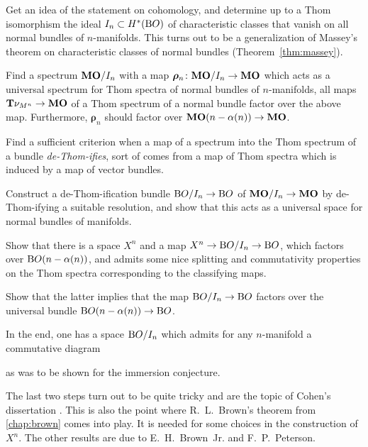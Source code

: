 \begin{steps}
\item
  Get an idea of the statement on cohomology, and determine up to a
  Thom isomorphism the ideal $I_{n}\subset H^*(\mathrm{B}O)$ of characteristic
  classes that vanish on all normal bundles of $n$-manifolds.
  This turns out to be a generalization of Massey's theorem on
  characteristic classes of normal bundles (Theorem~\ref{thm:massey}).
\item
  Find a spectrum $\bm{\mathrm{MO}}/I_{n}$ with a map
  $\bm{\rho}_n\colon \bm{\mathrm{MO}}/I_{n}\to\bm{\mathrm{MO}}$ which acts as a universal
  spectrum for Thom spectra of normal bundles of $n$-manifolds,
  \idest all maps $\bm{\mathrm{T}}{\nu_{M^n}}\to \bm{\mathrm{MO}}$ of a Thom spectrum of a
  normal bundle factor over the above map.
  Furthermore, $\bm{\rho}_n$ should factor
  over $\bm{\mathrm{MO}}(n-\alpha(n))\to\bm{\mathrm{MO}}$.
\item
  Find a sufficient criterion when a map of a spectrum into the Thom
  spectrum of a bundle \emph{de-Thom-ifies}, \idest sort of
  comes from a map of Thom spectra which is induced by a map
  of vector bundles.
\item
  Construct a de-Thom-ification bundle $\mathrm{B}O/I_{n}\to\mathrm{B}O$ of $\bm{\mathrm{MO}}/I_{n}\to\bm{\mathrm{MO}}$ by de-Thom-ifying a suitable resolution,
  and show that this acts as a universal space for normal
  bundles of manifolds.
\item
  Show that there is a space $X^n$ and a map
  $X^n\to\mathrm{B}O/I_{n}\to\mathrm{B}O$, which factors over $\mathrm{B}O(n-\alpha(n))$, and
  admits some nice splitting and  commutativity properties on the Thom
  spectra corresponding to the classifying maps.
\item
  Show that the latter implies that the map $\mathrm{B}O/I_{n}\to\mathrm{B}O$ factors
  over the universal bundle $\mathrm{B}O(n-\alpha(n))\to\mathrm{B}O$.
\end{steps}
In the end, one has a space $\mathrm{B}O/I_{n}$ which admits for
any $n$-manifold a commutative diagram
\begin{center}
\end{center}
as was to be shown for the immersion conjecture.

The last two steps turn out to be quite tricky and are the topic of
Cohen's dissertation \cite{cohen}. This is also the point where
R.~L.~Brown's theorem from \autoref{chap:brown} comes into play.
It is needed for some choices in the construction of $X^n$.
The other results are due to E.~H.~Brown~Jr. and F.~P.~Peterson.

